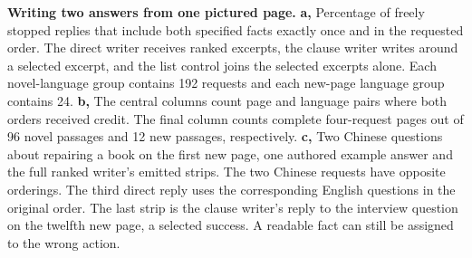 \textbf{Writing two answers from one pictured page.}
\textbf{a,} Percentage of freely stopped replies that include both specified facts exactly once and in the requested order. The direct writer receives ranked excerpts, the clause writer writes around a selected excerpt, and the list control joins the selected excerpts alone. Each novel-language group contains 192 requests and each new-page language group contains 24.
\textbf{b,} The central columns count page and language pairs where both orders received credit. The final column counts complete four-request pages out of 96 novel passages and 12 new passages, respectively.
\textbf{c,} Two Chinese questions about repairing a book on the first new page, one authored example answer and the full ranked writer's emitted strips. The two Chinese requests have opposite orderings. The third direct reply uses the corresponding English questions in the original order. The last strip is the clause writer's reply to the interview question on the twelfth new page, a selected success. A readable fact can still be assigned to the wrong action.
